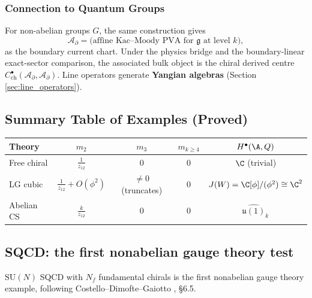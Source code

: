 \subsubsection{Connection to Quantum Groups}

For non-abelian groups $G$, the same construction gives
\begin{equation}
\mathcal{A}_{\partial} = \text{(affine Kac--Moody PVA for $\mathfrak{g}$ at level $k$)},
\end{equation}
as the boundary current chart.  Under the physics bridge and the
boundary-linear exact-sector comparison, the associated bulk object is
the chiral derived centre
$C^\bullet_{\mathrm{ch}}(\mathcal{A}_{\partial},\mathcal{A}_{\partial})$.
Line operators generate \textbf{Yangian algebras}
(Section \ref{sec:line_operators}).

\subsection{Summary Table of Examples (Proved)}

\begin{center}
\begin{tabular}{|l|c|c|c|c|}
\hline
\textbf{Theory} & $m_2$ & $m_3$ & $m_{k \geq 4}$ & $H^\bullet(\A, Q)$ \\
\hline
Free chiral & $\frac{1}{z_{12}}$ & $0$ & $0$ & $\C$ (trivial) \\
\hline
LG cubic & $\frac{1}{z_{12}} + O(\phi^2)$ & $\neq 0$ (truncates) & $0$ & $J(W) = \C[\phi]/(\phi^2) \cong \C^2$ \\
\hline
Abelian CS & $\frac{k}{z_{12}}$ & $0$ & $0$ & $\widehat{\mathfrak{u}(1)}_k$ \\
\hline
\end{tabular}
\end{center}

\subsection{SQCD: the first nonabelian gauge theory test}
\label{subsec:sqcd-nonabelian-test}

\providecommand{\QBRST}{Q_{\mathrm{BRST}}}

$\mathrm{SU}(N)$ SQCD with $N_f$ fundamental chirals is the first nonabelian gauge theory example, following Costello--Dimofte--Gaiotto
\cite{CDG2023}, \S6.5.


